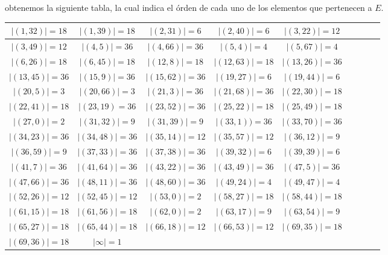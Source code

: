 \documentclass[letterpaper,11pt]{article}
\begin{document}
\begin{enumerate}
\begin{enumerate}
        obtenemos la siguiente tabla, la cual indica el órden de cada uno de
        los elementos que pertenecen a $E$.
        \begin{center}
        \begin{tabular}{c|c|c|c|c|c|c|c|c}
        $|(1, 32)| = 18$ & $|(1, 39)| = 18$ & $|(2, 31)| = 6$ & $|(2, 40)| = 6$ & 
        $|(3, 22)| = 12$ \\ \hline
        $|(3, 49)| = 12$ & $|(4, 5)| = 36$ & $|(4, 66)| = 36$ & $|(5, 4)| = 4$ &
        $|(5, 67)| = 4$  \\ \hline
        $|(6, 26)| = 18$ & $|(6, 45)| = 18$ & $|(12, 8)| = 18$ & 
        $|(12, 63)| = 18$ & $|(13, 26)| = 36$ \\ \hline
        $|(13, 45)| = 36$ & $|(15, 9)| = 36$ & $|(15, 62)| = 36$ & 
        $|(19, 27)| = 6$ & $|(19, 44)| = 6$ \\ \hline
        $|(20, 5)| = 3$ & $|(20, 66)| = 3$ & $|(21, 3)| = 36$ & 
        $|(21, 68)| = 36$ &  $|(22, 30)| = 18$ \\ \hline
        $|(22, 41)| = 18$ & $|(23, 19) = 36$ & $|(23, 52)| = 36$ & 
        $|(25, 22)| = 18$ & $|(25, 49)| = 18$ \\ \hline
        $|(27, 0)| = 2$ & $|(31, 32)| = 9$ & $|(31, 39)| = 9$ &  
        $|(33, 1)) = 36$ & $|(33, 70)| = 36$ \\  \hline
        $|(34, 23)| = 36$ & $|(34, 48)| = 36$ & $|(35, 14)| = 12$ & 
        $|(35, 57)| = 12$ & $|(36, 12)| = 9$ \\  \hline
        $|(36, 59)| = 9$ & $|(37, 33)| = 36$ & $|(37, 38)| = 36$ & 
        $|(39, 32)| = 6$ & $|(39, 39)| = 6$ \\ \hline
        $|(41, 7)| = 36$ & $|(41, 64)| = 36$ & $|(43, 22)| = 36$ & 
        $|(43, 49)| = 36$ & $|(47, 5)| = 36$ \\ \hline 
        $|(47, 66)| = 36$ & $|(48, 11)| = 36$ & $|(48, 60)| = 36$ & 
        $|(49, 24)| = 4$ & $|(49, 47)| = 4$ \\ \hline  
        $|(52, 26)| = 12$ & $|(52, 45)| = 12$ & $|(53, 0)| = 2$ & 
        $|(58, 27)| = 18$ & $|(58, 44)| = 18$ \\ \hline 
        $|(61, 15)| = 18$ & $|(61, 56)| = 18$ & $|(62, 0)| = 2$ & 
        $|(63, 17)| = 9$ & $|(63, 54)| = 9$ \\ \hline 
        $|(65, 27)| = 18$ & $|(65, 44)| = 18$ & $|(66, 18)| = 12$ & 
        $|(66, 53)| = 12$ & $|(69, 35)| = 18$ \\ \hline 
        $|(69, 36)| = 18$ & $|\infty| = 1$ 
        \end{tabular}
        \end{center}
        

\end{enumerate}
\end{enumerate}
\end{document}
